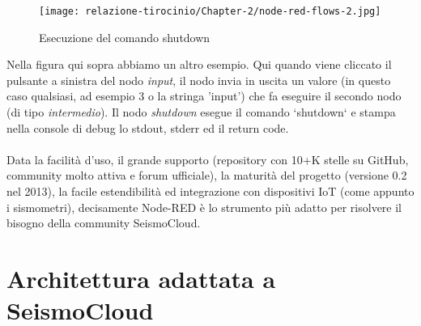 \documentclass[a4paper,10pt]{memoir}
\begin{document}
\begin{figure}[H]
\caption{Esecuzione del comando shutdown}
\label{fig:node-red-flows-example2}
\texttt{[image: relazione-tirocinio/Chapter-2/node-red-flows-2.jpg]}
\end{figure}
Nella figura qui sopra abbiamo un altro esempio. Qui quando viene cliccato il pulsante a sinistra del nodo \textit{input}, il nodo invia in uscita un valore (in questo caso qualsiasi, ad esempio 3 o la stringa 'input') che fa eseguire il secondo nodo (di tipo \textit{intermedio}). Il nodo \textit{shutdown} esegue il comando `shutdown` e stampa nella console di debug lo stdout, stderr ed il return code.
\\
\\
Data la facilità d'uso, il grande supporto (repository con 10+K stelle su GitHub, community molto attiva e forum ufficiale), la maturità del progetto (versione 0.2 nel 2013), la facile estendibilità ed integrazione con dispositivi IoT (come appunto i sismometri), decisamente Node-RED è lo strumento più adatto per risolvere il bisogno della community SeismoCloud.
\\
\clearpage

\section{Architettura adattata a SeismoCloud}
\end{document}
